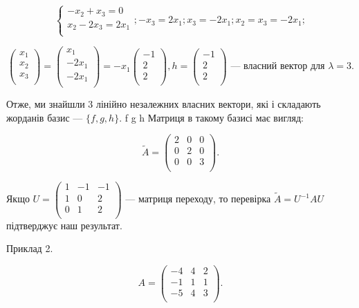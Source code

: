 $$\left\{ \begin{matrix}
	-x_2 + x_3 = 0 \\
	x_2 - 2 x_3 = 2 x_1 \\
\end{matrix} \right.; -x_3 = 2x_1; x_3 = -2x_1; x_2 = x_3 = -2x_1;$$

$$\begin{pmatrix}
	x_1 \\
	x_2 \\
	x_3 \\
\end{pmatrix} = \begin{pmatrix}
	x_1 \\
	-2 x_1 \\
	-2 x_1 \\
\end{pmatrix} = -x_1 \begin{pmatrix}
	-1 \\
	 2 \\
	 2 \\
\end{pmatrix}, h = \begin{pmatrix}
	-1 \\
	 2 \\
	 2 \\
\end{pmatrix} \text{ --- власний вектор для } \lambda = 3.$$

Отже, ми знайшли 3 лінійно незалежних власних вектори, які і складають
жорданів базис --- $\{f, g, h\}$. f g h Матриця в такому базисі має вигляд:

$$\tilde{A} = \begin{pmatrix}
	2 & 0 & 0 \\
	0 & 2 & 0 \\
	0 & 0 & 3 \\
\end{pmatrix}. $$

Якщо $U = \begin{pmatrix}
	1 & -1 & -1 \\
	1 &  0 &  2 \\
	0 &  1 &  2 \\
\end{pmatrix}$ --- матриця переходу, то перевірка $\tilde{A} = U^{-1} A U$
підтверджує наш результат.

Приклад 2.

$$A = \begin{pmatrix}
	-4 &  4 &  2 \\
	-1 &  1 &  1 \\
	-5 &  4 &  3 \\
\end{pmatrix}. $$

